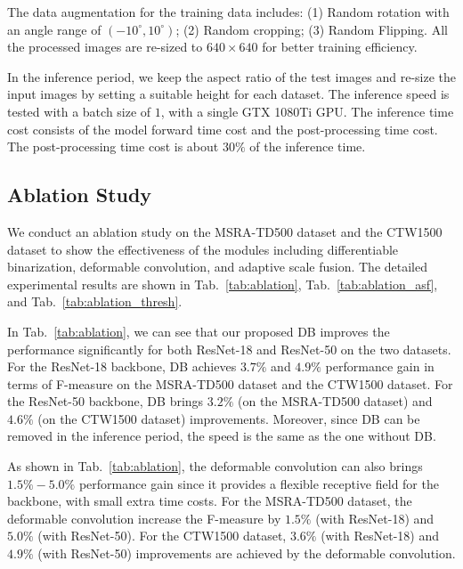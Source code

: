 The data augmentation for the training data includes: (1) Random rotation with an angle range of $(-10^{\circ}, 10^{\circ})$; (2) Random cropping; (3) Random Flipping. All the processed images are re-sized to $640 \times 640$ for better training efficiency.

In the inference period, we keep the aspect ratio of the test images and re-size the input images by setting a suitable height for each dataset. The inference speed is tested with a batch size of $1$, with a single GTX 1080Ti GPU. The inference time cost consists of the model forward time cost and the post-processing time cost. The post-processing time cost is about $30\%$ of the inference time.

\subsection{Ablation Study}
We conduct an ablation study on the MSRA-TD500 dataset and the CTW1500 dataset to show the effectiveness of the modules including differentiable binarization, deformable convolution, and adaptive scale fusion. The detailed experimental results are shown in Tab.~\ref{tab:ablation}, Tab.~\ref{tab:ablation_asf},  and Tab.~\ref{tab:ablation_thresh}.

In Tab.~\ref{tab:ablation}, we can see that our proposed DB improves the performance significantly for both ResNet-18 and ResNet-50 on the two datasets.
For the ResNet-18 backbone, DB achieves $3.7\%$ and $4.9\%$ performance gain in terms of F-measure on the MSRA-TD500 dataset and the CTW1500 dataset. For the ResNet-50 backbone, DB brings $3.2\%$ (on the MSRA-TD500 dataset) and $4.6\%$ (on the CTW1500 dataset) improvements. Moreover, since DB can be removed in the inference period, the speed is the same as the one without DB. 

As shown in Tab.~\ref{tab:ablation}, the deformable convolution can also brings $1.5\%-5.0\%$ performance gain since it provides a flexible receptive field for the backbone, with small extra time costs. For the MSRA-TD500 dataset, the deformable convolution increase the F-measure by $1.5\%$ (with ResNet-18) and $5.0\%$ (with ResNet-50). For the CTW1500 dataset, $3.6\%$ (with ResNet-18) and $4.9\%$ (with ResNet-50) improvements are achieved by the deformable convolution.

